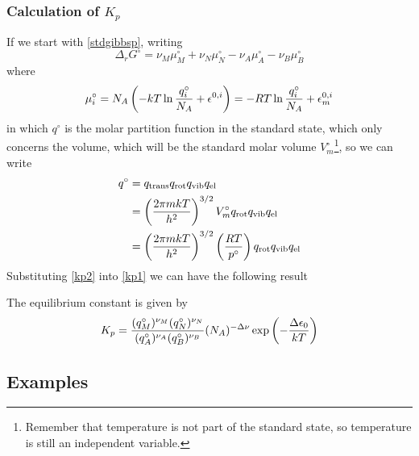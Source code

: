 \subsubsection{Calculation of \texorpdfstring{$K_p$}{Kp}}
If we start with \cref{stdgibbsp}, writing 
\begin{equation}
\label{kp1}
  \Delta_rG^{\circ}=\nu_M\mu^{\circ}_M+\nu_N\mu^{\circ}_N-\nu_A\mu^{\circ}_A-\nu_B\mu^{\circ}_B
\end{equation}
where
\begin{equation}
\label{kp2}
  \mu_i^{\circ}=N_A\left(-kT\ln\frac{q_i^{\circ}}{N_A}+\epsilon^{0,i} \right)=-RT\ln\frac{q_i^{\circ}}{N_A}+\epsilon_m^{0,i}
\end{equation}
in which $q^{\circ}$ is the molar partition function in the standard state, which only concerns the volume, which will be the standard molar volume $V_m^{\circ}$\footnote{Remember that temperature is not part of the standard state, so temperature is still an independent variable.}, so we can write
\begin{equation}
\label{kp3}
\begin{aligned}
  q^{\circ}&=q_{\text{trans}}q_{\text{rot}}q_{\text{vib}}q_{\text{el}}\\
  &=\left(\frac{2\pi mkT}{h^2} \right)^{3/2}V_m^{\circ}q_{\text{rot}}q_{\text{vib}}q_{\text{el}}\\
  &=\left(\frac{2\pi mkT}{h^2} \right)^{3/2}\left(\frac{RT}{p^{\circ}} \right)q_{\text{rot}}q_{\text{vib}}q_{\text{el}}
\end{aligned}
\end{equation}
Substituting \cref{kp2} into \cref{kp1} we can have the following result
\begin{thrm}[Expression of $K_p$]
The equilibrium constant is given by
\begin{equation}
  K_p=\frac{(q^{\circ}_M)^{\nu_M}(q^{\circ}_N)^{\nu_N}}{(q^{\circ}_A)^{\nu_A}(q^{\circ}_B)^{\nu_B}}(N_A)^{-\Delta\nu}\exp\left(-\frac{\Delta\epsilon_0}{kT} \right)
\end{equation}
\end{thrm}
\subsection{Examples}
